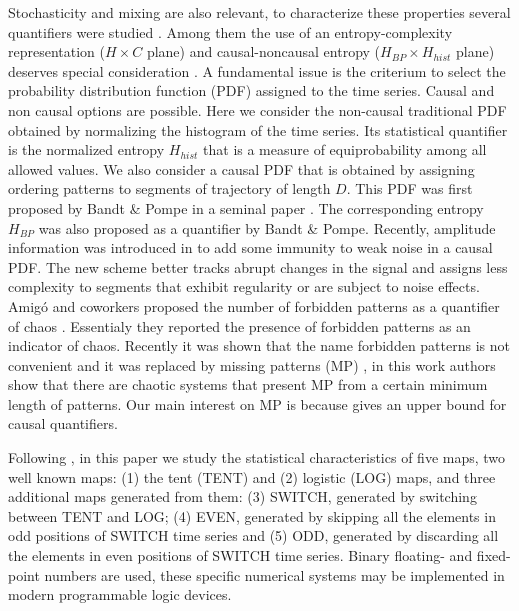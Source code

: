Stochasticity and mixing are also relevant, to characterize these properties several quantifiers were studied \cite{DeMicco2009}.
Among them the use of an entropy-complexity representation ($H \times C$ plane) and causal-noncausal entropy ($H_{BP} \times H_{hist}$ plane) deserves special consideration \cite{Rosso2007,DeMicco2008,DeMicco2012,DeMicco2009,Rosso2010,Antonelli2017}.
A fundamental issue is the criterium to select the probability distribution function (PDF) assigned to the time series.
Causal and non causal options are possible.
Here we consider the non-causal traditional PDF obtained by normalizing the histogram of the time series.
Its statistical quantifier is the normalized entropy $H_{hist}$ that is a measure of equiprobability among all allowed values.
We also consider a causal PDF that is obtained by assigning ordering patterns to segments of trajectory of length $D$.
This PDF was first proposed by Bandt \& Pompe in a seminal paper \cite{Bandt2002}.
The corresponding entropy $H_{BP}$ was also proposed as a quantifier by Bandt \& Pompe.
Recently, amplitude information was introduced in \cite{Fadlallah2013} to add some immunity to weak noise in a causal PDF.
The new scheme better tracks abrupt changes in the signal and assigns less complexity to segments that exhibit regularity or are subject to noise effects.
Amig\'o and coworkers proposed the number of forbidden patterns as a quantifier of chaos \cite{Amigo2007a}.
Essentialy they reported the presence of forbidden patterns as an indicator of chaos.
Recently it was shown that the name forbidden patterns is not convenient and it was replaced by missing patterns (MP) \cite{Rosso2012}, in this work authors show that there are chaotic systems that present MP from a certain minimum length of patterns.
Our main interest on MP is because gives an upper bound for causal quantifiers.

Following \cite{Nagaraj2008}, in this paper we study the statistical characteristics of five maps, two well known maps: (1) the tent (TENT) and (2) logistic (LOG) maps, and three additional maps generated from them: (3) SWITCH, generated by switching between TENT and LOG; (4) EVEN, generated by skipping all the elements in odd positions of SWITCH time series and (5) ODD, generated by discarding all the elements in even positions of SWITCH time series.
Binary floating- and fixed-point numbers are used, these specific numerical systems may be implemented in modern programmable logic devices.

